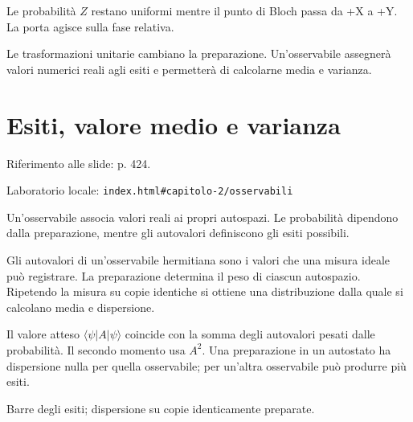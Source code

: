 
Le probabilità \(Z\) restano uniformi mentre il punto di Bloch passa da +X a +Y. La porta agisce sulla fase relativa.\par


Le trasformazioni unitarie cambiano la preparazione. Un'osservabile assegnerà valori numerici reali agli esiti e permetterà di calcolarne media e varianza.\par



\Needspace{.43\textheight}
\section{Esiti, valore medio e varianza}
\label{c2-osservabili}

{\sffamily\small\color{Ink!70} Riferimento alle slide: p. 424.\par}

{\sffamily\small\color{Ink!70} Laboratorio locale: \nolinkurl{index.html#capitolo-2/osservabili}\par}

Un'osservabile associa valori reali ai propri autospazi. Le probabilità dipendono dalla preparazione, mentre gli autovalori definiscono gli esiti possibili.\par

Gli autovalori di un'osservabile hermitiana sono i valori che una misura ideale può registrare. La preparazione determina il peso di ciascun autospazio. Ripetendo la misura su copie identiche si ottiene una distribuzione dalla quale si calcolano media e dispersione.\par

Il valore atteso \(\langle \psi |A|\psi \rangle \) coincide con la somma degli autovalori pesati dalle probabilità. Il secondo momento usa \(A^{2}\). Una preparazione in un autostato ha dispersione nulla per quella osservabile; per un'altra osservabile può produrre più esiti.\par



Barre degli esiti; dispersione su copie identicamente preparate.\par


